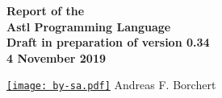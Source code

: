 \begin{titlepage}
   \begin{flushright}
      {\Huge \bfseries
	 Report of the \\
	 Astl Programming Language \\
	 Draft in preparation of version 0.34 \\
	 4 November 2019 \\
      }

      \vspace*{\fill}

      \href{https://creativecommons.org/licenses/by-sa/4.0/}
      {\texttt{[image: by-sa.pdf]}}
      \hspace*{\fill}
      {\huge
	 Andreas F. Borchert \\
      }
   \end{flushright}
\end{titlepage}
